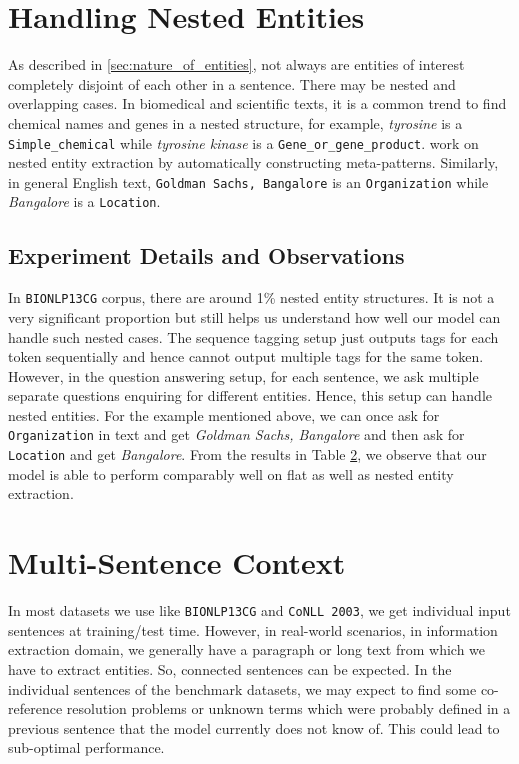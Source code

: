 \section{Handling Nested Entities}
As described in \ref{sec:nature_of_entities}, not always are entities of interest completely disjoint of each other in a sentence. There may be nested and overlapping cases. In biomedical and scientific texts, it is a common trend to find chemical names and genes in a nested structure, for example, \textit{tyrosine} is a \texttt{Simple\_chemical} while \textit{tyrosine kinase} is a \texttt{Gene\_or\_gene\_product}. \cite{wang2018penner} work on nested entity extraction by automatically constructing meta-patterns. Similarly, in general English text, \texttt{Goldman Sachs, Bangalore} is an \texttt{Organization} while \textit{Bangalore} is a \texttt{Location}. 

\subsection{Experiment Details and Observations}

In \texttt{BIONLP13CG} corpus, there are around 1\% nested entity structures. It is not a very significant proportion but still helps us understand how well our model can handle such nested cases. The sequence tagging setup just outputs tags for each token sequentially and hence cannot output multiple tags for the same token. However, in the question answering setup, for each sentence, we ask multiple separate questions enquiring for different entities. Hence, this setup can handle nested entities. For the example mentioned above, we can once ask for \texttt{Organization} in text and get \textit{Goldman Sachs, Bangalore} and then ask for \texttt{Location} and get \textit{Bangalore}. From the results in Table \ref{}, we observe that our model is able to perform comparably well on flat as well as nested entity extraction.

\section{Multi-Sentence Context}
In most datasets we use like \texttt{BIONLP13CG} and \texttt{CoNLL 2003}, we get individual input sentences at training/test time. However, in real-world scenarios, in information extraction domain, we generally have a paragraph or long text from which we have to extract entities. So, connected sentences can be expected. In the individual sentences of the benchmark datasets, we may expect to find some co-reference resolution problems or unknown terms which were probably defined in a previous sentence that the model currently does not know of. This could lead to sub-optimal performance. 

